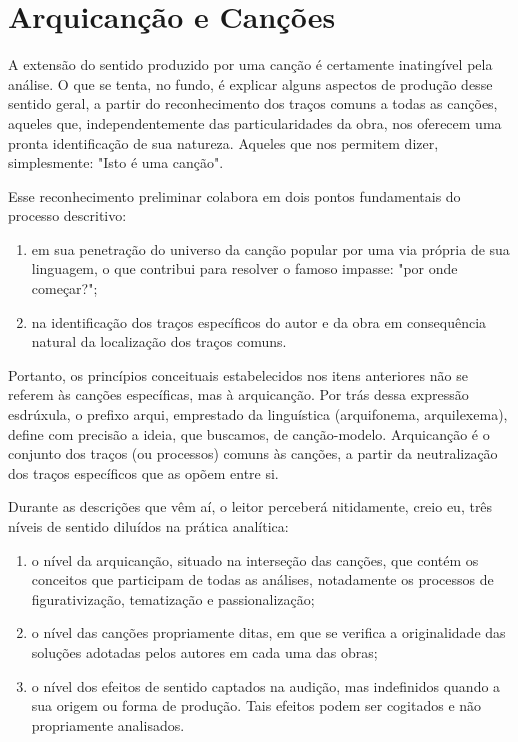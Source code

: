 \section{Arquicanção e Canções}

A extensão do sentido produzido por uma canção é certamente inatingível
pela análise. O que se tenta, no fundo, é explicar alguns aspectos de
produção desse sentido geral, a partir do reconhecimento dos traços
comuns a todas as canções, aqueles que, independentemente das
particularidades da obra, nos oferecem uma pronta identificação de sua
natureza. Aqueles que nos permitem dizer, simplesmente: "Isto é uma
canção".~

Esse reconhecimento preliminar colabora em dois pontos fundamentais do
processo descritivo:

\begin{enumerate}[label=\alph*]
\item em sua penetração do universo da canção popular por uma via própria
de sua linguagem, o que contribui para resolver o famoso impasse: "por
onde começar?";

\item na identificação dos traços específicos do autor e da obra em
consequência natural da localização dos traços comuns.
\end{enumerate}

Portanto, os princípios conceituais estabelecidos nos itens anteriores
não se referem às canções específicas, mas à arquicanção. Por trás dessa
expressão esdrúxula, o prefixo arqui, emprestado da linguística
(arquifonema, arquilexema), define com precisão a ideia, que buscamos,
de canção-modelo. Arquicanção é o conjunto dos traços (ou processos)
comuns às canções, a partir da neutralização dos traços específicos que
as opõem entre si.~

Durante as descrições que vêm aí, o leitor perceberá nitidamente, creio
eu, três níveis de sentido diluídos na prática analítica:

\begin{enumerate}[label=\alph*]
\item o nível da arquicanção, situado na interseção das canções, que contém
os conceitos que participam de todas as análises, notadamente os
processos de figurativização, tematização e passionalização;

\item o nível das canções propriamente ditas, em que se verifica a
originalidade das soluções adotadas pelos autores em cada uma das obras;

\item o nível dos efeitos de sentido captados na audição, mas indefinidos
quando a sua origem ou forma de produção. Tais efeitos podem ser
cogitados e não propriamente analisados.
\end{enumerate}

